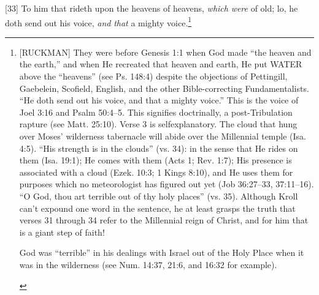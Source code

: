 [33] \textcolor[rgb]{0.00,0.00,1.00}{To him that rideth upon the heavens of heavens, \emph{which} \emph{were} of old; lo, he doth send out his voice, \emph{and} \emph{that} a mighty voice.}\footnote{[RUCKMAN] They were before Genesis 1:1 when God made “the heaven and the earth,” and when He recreated that heaven and earth, He put WATER above the “heavens” (see Ps. 148:4) despite the objections of Pettingill, Gaebelein, Scofield, English, and the other Bible-correcting Fundamentalists. “He doth send out his voice, and that a mighty voice.” This is the voice of Joel 3:16 and Psalm 50:4--5. This signifies doctrinally, a post-Tribulation rapture (see Matt. 25:10). Verse 3 is selfexplanatory. The cloud that hung over Moses’ wilderness tabernacle will abide over the Millennial temple (Isa. 4:5). “His strength is in the clouds” (vs. 34): in the sense that He rides on them (Isa. 19:1); He comes with them (Acts 1; Rev. 1:7); His presence is associated with a cloud (Ezek. 10:3; 1 Kings 8:10), and He uses them for purposes which no meteorologist has figured out yet (Job 36:27--33, 37:11--16). “O God, thou art terrible out of thy holy places” (vs. 35). Although Kroll can’t expound one word in the sentence, he at least grasps the truth that verses 31 through 34 refer to the Millennial reign of Christ, and for him that is a giant step of faith!  \cite{Ruckman1992Psalms}  
\begin{compactenum}
	\item God was “terrible” in his dealings with Israel out of the Holy Place when it was in the wilderness (see Num. 14:37, 21:6, and 16:32 for example).

\end{compactenum}}
